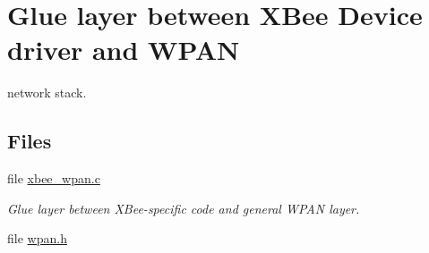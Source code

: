 \hypertarget{group__xbee__wpan}{}\section{Glue layer between X\+Bee Device driver and W\+P\+AN}
\label{group__xbee__wpan}


network stack.  


\subsection*{Files}
\begin{DoxyCompactItemize}
\item 
file \hyperlink{xbee__wpan_8c}{xbee\+\_\+wpan.\+c}
\begin{DoxyCompactList}\small\item\em Glue layer between X\+Bee-\/specific code and general W\+P\+AN layer. \end{DoxyCompactList}\item 
file \hyperlink{wpan_8h}{wpan.\+h}
\end{DoxyCompactItemize}
